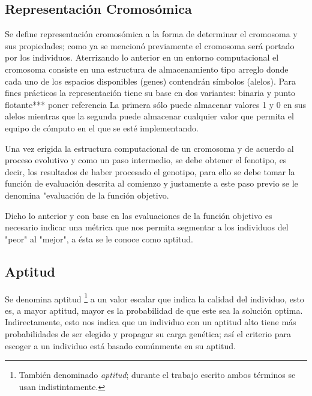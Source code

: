\documentclass[class=report, crop=false]{standalone}
\begin{document}
\subsection{Representación Cromosómica}
\label{sec:c2_5}
Se define representación cromosómica a la forma de determinar 
el cromosoma y sus propiedades; como ya se mencionó previamente 
el cromosoma será portado por los individuos.\break
Aterrizando lo anterior en un entorno computacional el cromosoma 
consiste en una estructura de almacenamiento tipo arreglo donde cada 
uno de los espacios disponibles (genes) contendrán símbolos (alelos).
Para fines prácticos la representación tiene su base en dos variantes: 
binaria y punto flotante*** poner referencia
La primera sólo puede almacenar valores 1 y 0 en sus alelos mientras 
que la segunda puede almacenar cualquier valor que permita el equipo 
de cómputo en el que se esté implementando.

Una vez erigida la estructura computacional de un cromosoma y de
acuerdo al proceso evolutivo y como un paso intermedio, se debe
obtener el fenotipo, es decir, los resultados de haber procesado el 
genotipo, para ello se debe tomar la función de evaluación descrita al
comienzo y justamente a este paso previo se le denomina "evaluación de la
función objetivo.\break

Dicho lo anterior y con base en las evaluaciones de la función objetivo 
es necesario indicar una métrica que nos permita segmentar a los individuos 
del "peor" al "mejor", a ésta se le conoce como aptitud.

\subsection{Aptitud}
\label{sec:c2_3}
Se denomina aptitud \footnote{También denominado \textit{aptitud}; 
durante el trabajo escrito ambos términos se usan indistintamente.} 
a un valor escalar que indica la calidad del individuo, esto es, 
a mayor aptitud, mayor es la probabilidad de que este sea la 
solución optima.\break
Indirectamente, esto nos indica que un individuo con un 
aptitud alto tiene más probabilidades de ser elegido y propagar 
su carga genética; así el criterio para escoger a un individuo 
está basado comúnmente en su aptitud.\medskip\break
\end{document}

